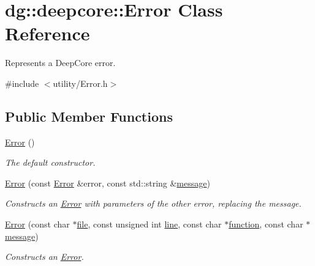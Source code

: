 \hypertarget{classdg_1_1deepcore_1_1_error}{}\section{dg\+:\+:deepcore\+:\+:Error Class Reference}
\label{classdg_1_1deepcore_1_1_error}


Represents a Deep\+Core error.  




{\ttfamily \#include $<$utility/\+Error.\+h$>$}

\subsection*{Public Member Functions}
\begin{DoxyCompactItemize}
\item 
\hyperlink{classdg_1_1deepcore_1_1_error_a943534a24622307ce6903bd92d5a60a8}{Error} ()
\begin{DoxyCompactList}\small\item\em The default constructor. \end{DoxyCompactList}\item 
\hyperlink{classdg_1_1deepcore_1_1_error_aeedd4c1e5e96e13e92eede0f9597a7eb}{Error} (const \hyperlink{classdg_1_1deepcore_1_1_error}{Error} \&error, const std\+::string \&\hyperlink{group___utility_module_ga7269ba8049ed86338733955565242539}{message})
\begin{DoxyCompactList}\small\item\em Constructs an \hyperlink{classdg_1_1deepcore_1_1_error}{Error} with parameters of the other error, replacing the message. \end{DoxyCompactList}\item 
\hyperlink{group___utility_module_ga345a7202460cb865e17cff4a78c7bcf6}{Error} (const char $\ast$\hyperlink{group___utility_module_ga0b75e32780cb8534179ff3c060739496}{file}, const unsigned int \hyperlink{group___utility_module_ga13437b5caffe754b7a32fc3c514907e5}{line}, const char $\ast$\hyperlink{group___utility_module_gaa69c98222c56544a9094154a8eab4db9}{function}, const char $\ast$\hyperlink{group___utility_module_ga7269ba8049ed86338733955565242539}{message})
\begin{DoxyCompactList}\small\item\em Constructs an \hyperlink{classdg_1_1deepcore_1_1_error}{Error}. \end{DoxyCompactList}\item 

\end{DoxyCompactItemize}
